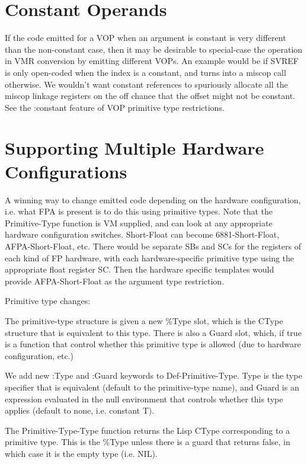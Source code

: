 \section{Constant Operands}

If the code emitted for a VOP when an argument is constant is very different
than the non-constant case, then it may be desirable to special-case the
operation in VMR conversion by emitting different VOPs.  An example would be if
SVREF is only open-coded when the index is a constant, and turns into a miscop
call otherwise.  We wouldn't want constant references to spuriously allocate
all the miscop linkage registers on the off chance that the offset might not be
constant.  See the :constant feature of VOP primitive type restrictions.

\section{Supporting Multiple Hardware Configurations}


A winning way to change emitted code depending on the hardware configuration,
i.e. what FPA is present is to do this using primitive types.  Note that the
Primitive-Type function is VM supplied, and can look at any appropriate
hardware configuration switches.  Short-Float can become 6881-Short-Float,
AFPA-Short-Float, etc.  There would be separate SBs and SCs for the registers
of each kind of FP hardware, with each hardware-specific primitive type
using the appropriate float register SC.  Then the hardware specific templates
would provide AFPA-Short-Float as the argument type restriction.

Primitive type changes:

The primitive-type structure is given a new \%Type slot, which is the CType
structure that is equivalent to this type.  There is also a Guard slot, which,
if true is a function that control whether this primitive type is allowed (due
to hardware configuration, etc.)  

We add new :Type and :Guard keywords to Def-Primitive-Type.  Type is the type
specifier that is equivalent (default to the primitive-type name), and Guard is
an expression evaluated in the null environment that controls whether this type
applies (default to none, i.e. constant T).

The Primitive-Type-Type function returns the Lisp CType corresponding to a
primitive type.  This is the \%Type unless there is a guard that returns false,
in which case it is the empty type (i.e. NIL).

